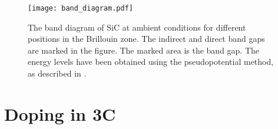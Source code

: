 \begin{figure}[h]
\begin{center}
\texttt{[image: band\_diagram.pdf]}
\caption{The band diagram of SiC at ambient conditions for different positions in the Brillouin zone. The indirect and direct band gaps are marked in the figure. The marked area is the band gap. The energy levels have been obtained using the pseudopotential method, as described in \cite{Aourag1994}.
\label{fig:band}}
\end{center}
\end{figure}





\section{Doping in 3C}
\label{sec:doping_in_3C}

























